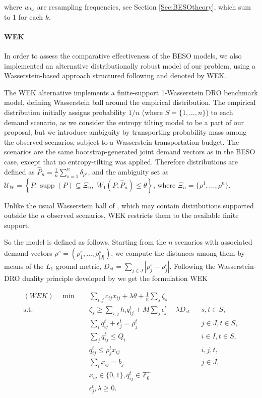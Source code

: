 \documentclass[mnsc,sglanonrev]{informs4}  %
\theoremstyle{remark}\newtheorem{remark}{Remark}
\begin{document}
\noindent where $w_{ks}$ are resampling frequencies, see Section \ref{Sec:BESOtheory}, which sum to 1 for each $k$.

\paragraph{WEK}

In order to assess the comparative effectiveness of the BESO models, we also implemented an alternative distributionally robust model of our problem, using a Wasserstein-based approach structured following \cite{EK18} and denoted by WEK.

The WEK alternative implements a finite-support 1-Wasserstein DRO benchmark model, defining Wasserstein ball around the empirical distribution. The empirical distribution initially assigns probability $1/n$ (where $S=\{1,\ldots,n\}$) to each demand scenario, as we consider the entropy tilting model to be a part of our proposal, but we introduce ambiguity by transporting probability mass among the observed scenarios, subject to a Wasserstein transportation budget. The scenarios are the same bootstrap-generated joint demand vectors as in the BESO case, except that no entropy-tilting was applied.
Therefore distributions are defined as $ \widehat P_n=\frac1n\sum_{s=1}^n\delta_{\rho^s}$, and the ambiguity set as $\mathcal U_{\mathrm W} = \left\{ P:\operatorname{supp}(P)\subseteq\Xi_n,\; W_1(P,\widehat P_n)\le \theta \right\}$, where $\Xi_n=\{\rho^1,\ldots,\rho^n\}$.

Unlike the usual Wasserstein ball of \citet{EK18}, which may contain distributions supported outside the $n$ observed scenarios, WEK restricts them to the available finite support.

So the model is defined as follows. Starting from the $n$ scenarios with associated demand vectors $ \rho^s=(\rho_1^s,\ldots,\rho_{|J|}^s)$, we compute the distances among them by means of the $L_1$ ground metric, $ D_{st} = \sum_{j\in J} |\rho_j^s-\rho_j^t| $. 
Following the Wasserstein-DRO duality principle developed by \citet{EK18} we get the formulation WEK

\begin{align}
(WEK) \quad \min\quad& \sum_{i,j}c_{ij}x_{ij} +\lambda \theta +\frac1n\sum_s\zeta_s \\[1mm]
\text{s.t.}\quad& \zeta_s\ge \sum_{i,j}h_iq_{ij}^{t} +M\sum_j\epsilon_j^t -\lambda D_{st} &&s,t\in S, \\
& \sum_iq_{ij}^{t}+\epsilon_j^t=\rho_j^t &&j\in J,t\in S,\\
& \sum_jq_{ij}^{t}\le Q_i &&i\in I,t\in S, \\
& q_{ij}^{t}\le\rho_j^t x_{ij} &&i,j,t, \\
& \sum_i x_{ij}=b_j &&j\in J, \\
& x_{ij}\in\{0,1\}, q_{ij}^t \in \mathbb{Z}^+_0\\
& \epsilon_j^t, \lambda\ge 0. 
\end{align}
\end{document}
